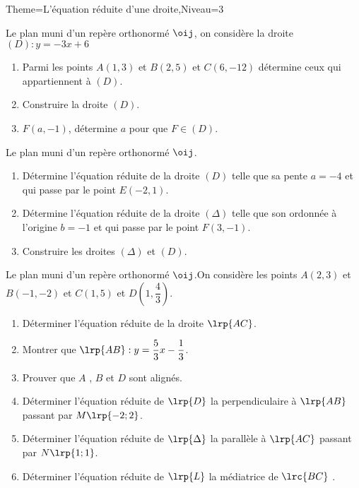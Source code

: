 \documentclass[a4paper,12pt]{article}
\begin{document}
\begin{Maquette}[Fiche]{Theme=L'équation réduite d'une droite,Niveau=3}

\begin{exercice}%
Le plan muni d'un repère orthonormé $\oij$, on considère la droite $(D):y=-3x+6$
\begin{enumerate}
\item Parmi les points $A(1,3)$ et $B(2,5)$ et $C(6,-12)$ détermine ceux qui appartiennent à $(D)$.
\item Construire la droite $(D)$.
\item $F(a,-1)$, détermine $a$ pour que $F\in (D)$. 
\end{enumerate}
\end{exercice}

\begin{exercice}%
Le plan muni d'un repère orthonormé $\oij$.
\begin{enumerate}
\item Détermine l'équation réduite de la droite $(D)$ telle que sa pente $a=-4$ et qui passe par le point $E(-2,1)$.
\item Détermine l'équation réduite de la droite $(\Delta)$ telle que son ordonnée à l'origine $b=-1$ et qui passe par le point $F(3,-1)$.
\item Construire les droites $(\Delta)$ et $(D)$.
\end{enumerate}
\end{exercice}

\begin{exercice}%
Le plan muni d'un repère orthonormé $\oij$.On considère les points $A(2,3)$ et $B(-1,-2)$ et $C(1,5)$ et $D(1,\dfrac{4}{3})$.
\begin{enumerate}
\item Déterminer l'équation réduite de la droite $\lrp{AC}$.
\item Montrer que $\lrp{AB}: y=\dfrac{5}{3}x-\dfrac{1}{3}$.
\item Prouver que $A$ , $B$ et $D$ sont alignés.
\item Déterminer l'équation réduite de  $\lrp{D}$ la perpendiculaire à $\lrp{AB}$ passant par $M\lrp{-2;2}$.
\item Déterminer l'équation réduite de  $\lrp{\Delta}$ la parallèle à $\lrp{AC}$ passant par $N\lrp{1;1}$.
\item Déterminer l'équation réduite de  $\lrp{L}$ la médiatrice de $\lrc{BC}$ .
\end{enumerate}
\end{exercice}


\end{Maquette}
\end{document}
